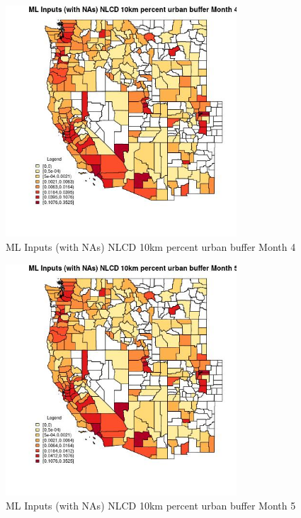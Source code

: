 \begin{figure} 
\centering  
\includegraphics[width=0.77\textwidth]{Code_Outputs/Report_ML_input_PM25_Step4_part_f_de_duplicated_aves_prioritize_24hr_obswNAs_CountyNLCD_10km_percent_urban_buffermedianMonth4.jpg} 
\caption{\label{fig:Report_ML_input_PM25_Step4_part_f_de_duplicated_aves_prioritize_24hr_obswNAsCountyNLCD_10km_percent_urban_buffermedianMonth4}ML Inputs (with NAs) NLCD 10km percent urban buffer Month 4} 
\end{figure} 
 

\begin{figure} 
\centering  
\includegraphics[width=0.77\textwidth]{Code_Outputs/Report_ML_input_PM25_Step4_part_f_de_duplicated_aves_prioritize_24hr_obswNAs_CountyNLCD_10km_percent_urban_buffermedianMonth5.jpg} 
\caption{\label{fig:Report_ML_input_PM25_Step4_part_f_de_duplicated_aves_prioritize_24hr_obswNAsCountyNLCD_10km_percent_urban_buffermedianMonth5}ML Inputs (with NAs) NLCD 10km percent urban buffer Month 5} 
\end{figure} 
 

